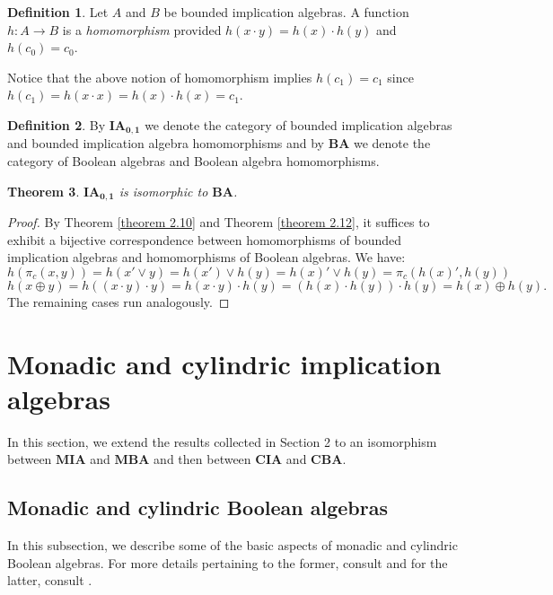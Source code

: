 \documentclass[reqno]{amsart}
\theoremstyle{plain}
\newtheorem{theorem}{Theorem}[section]
\theoremstyle{definition}
\newtheorem{definition}[theorem]{Definition}
\begin{document}
\begin{definition}
    Let $A$ and $B$ be bounded implication algebras. A function $h\colon A\to B$ is a \emph{homomorphism} provided $h(x\cdot y)=h(x)\cdot h(y)$ and $h(c_0)=c_0$. 
\end{definition}
Notice that the above notion of homomorphism implies $h(c_1)=c_1$ since $h(c_1)=h(x\cdot x)=h(x)\cdot h(x)=c_1$. 
\begin{definition}
    By $\mathbf{IA_{0,1}}$ we denote the category of bounded implication algebras and bounded implication algebra homomorphisms and by $\mathbf{BA}$ we denote the category of Boolean algebras and Boolean algebra homomorphisms. 
\end{definition}
\begin{theorem}\label{theorem 2.15}
    $\mathbf{IA_{0,1}}$ is isomorphic to $\mathbf{BA}$. 
\end{theorem}
\begin{proof}
    By Theorem \ref{theorem 2.10} and Theorem \ref{theorem 2.12}, it suffices to exhibit a bijective correspondence between homomorphisms of bounded implication algebras and homomorphisms of Boolean algebras. We have: \[h(\pi_c(x,y))=h(x'\vee y)=h(x')\vee h(y)=h(x)'\vee h(y)=\pi_c(h(x)',h(y))\] \[h(x\oplus y)=h((x\cdot y)\cdot y)=h(x\cdot y)\cdot h(y)=(h(x)\cdot h(y))\cdot h(y)=h(x)\oplus h(y).\] The remaining cases run analogously.   
\end{proof}
\section{Monadic and cylindric implication algebras}
In this section, we extend the results collected in Section 2 to an isomorphism between $\mathbf{MIA}$ and $\mathbf{MBA}$ and then between $\mathbf{CIA}$ and $\mathbf{CBA}$. 
\subsection{Monadic and cylindric Boolean algebras} In this subsection, we describe some of the basic aspects of monadic and cylindric Boolean algebras. For more details pertaining to the former, consult \cite{halmos} and for the latter, consult \cite{tarski1, tarski2}.   
\end{document}

